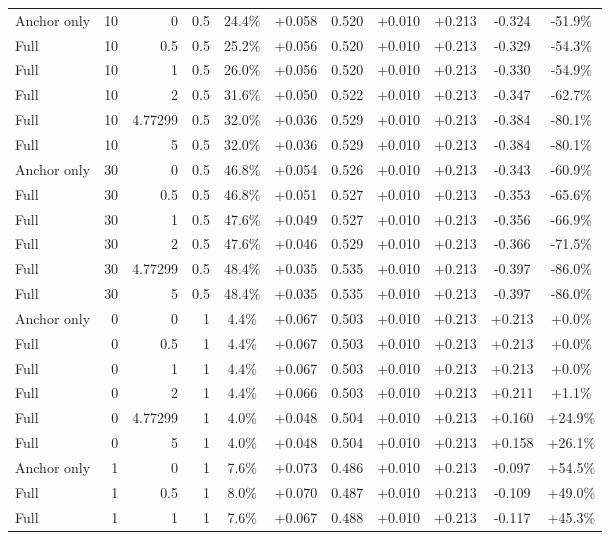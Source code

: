 \begin{table}[htbp]
\begin{tabular}{lrrrccccccc}
Anchor only & 10 & 0 & 0.5 & 24.4\% & +0.058 & 0.520 & +0.010 & +0.213 & -0.324 & -51.9\% \\
Full & 10 & 0.5 & 0.5 & 25.2\% & +0.056 & 0.520 & +0.010 & +0.213 & -0.329 & -54.3\% \\
Full & 10 & 1 & 0.5 & 26.0\% & +0.056 & 0.520 & +0.010 & +0.213 & -0.330 & -54.9\% \\
Full & 10 & 2 & 0.5 & 31.6\% & +0.050 & 0.522 & +0.010 & +0.213 & -0.347 & -62.7\% \\
Full & 10 & 4.77299 & 0.5 & 32.0\% & +0.036 & 0.529 & +0.010 & +0.213 & -0.384 & -80.1\% \\
Full & 10 & 5 & 0.5 & 32.0\% & +0.036 & 0.529 & +0.010 & +0.213 & -0.384 & -80.1\% \\
Anchor only & 30 & 0 & 0.5 & 46.8\% & +0.054 & 0.526 & +0.010 & +0.213 & -0.343 & -60.9\% \\
Full & 30 & 0.5 & 0.5 & 46.8\% & +0.051 & 0.527 & +0.010 & +0.213 & -0.353 & -65.6\% \\
Full & 30 & 1 & 0.5 & 47.6\% & +0.049 & 0.527 & +0.010 & +0.213 & -0.356 & -66.9\% \\
Full & 30 & 2 & 0.5 & 47.6\% & +0.046 & 0.529 & +0.010 & +0.213 & -0.366 & -71.5\% \\
Full & 30 & 4.77299 & 0.5 & 48.4\% & +0.035 & 0.535 & +0.010 & +0.213 & -0.397 & -86.0\% \\
Full & 30 & 5 & 0.5 & 48.4\% & +0.035 & 0.535 & +0.010 & +0.213 & -0.397 & -86.0\% \\
Anchor only & 0 & 0 & 1 & 4.4\% & +0.067 & 0.503 & +0.010 & +0.213 & +0.213 & +0.0\% \\
Full & 0 & 0.5 & 1 & 4.4\% & +0.067 & 0.503 & +0.010 & +0.213 & +0.213 & +0.0\% \\
Full & 0 & 1 & 1 & 4.4\% & +0.067 & 0.503 & +0.010 & +0.213 & +0.213 & +0.0\% \\
Full & 0 & 2 & 1 & 4.4\% & +0.066 & 0.503 & +0.010 & +0.213 & +0.211 & +1.1\% \\
Full & 0 & 4.77299 & 1 & 4.0\% & +0.048 & 0.504 & +0.010 & +0.213 & +0.160 & +24.9\% \\
Full & 0 & 5 & 1 & 4.0\% & +0.048 & 0.504 & +0.010 & +0.213 & +0.158 & +26.1\% \\
Anchor only & 1 & 0 & 1 & 7.6\% & +0.073 & 0.486 & +0.010 & +0.213 & -0.097 & +54.5\% \\
Full & 1 & 0.5 & 1 & 8.0\% & +0.070 & 0.487 & +0.010 & +0.213 & -0.109 & +49.0\% \\
Full & 1 & 1 & 1 & 7.6\% & +0.067 & 0.488 & +0.010 & +0.213 & -0.117 & +45.3\% \\

\end{tabular}
\end{table}
